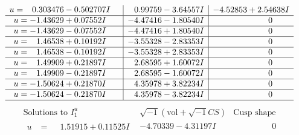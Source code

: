 \documentclass[1p]{elsarticle_modified}
\theoremstyle{definition}
\newcommand{\I}{\sqrt{-1}}
\begin{document}
$$\begin{array}{c|c|c}
\begin{aligned}
u &= \phantom{-}0.303476 - 0.502707 I\end{aligned}
 & \phantom{-}0.99759 - 3.64557 I & -4.52853 + 2.54638 I \\ \hline\begin{aligned}
u &= -1.43629 + 0.07552 I\end{aligned}
 & -4.47416 - 1.80540 I & \phantom{-0.000000 } 0 \\ \hline\begin{aligned}
u &= -1.43629 - 0.07552 I\end{aligned}
 & -4.47416 + 1.80540 I & \phantom{-0.000000 } 0 \\ \hline\begin{aligned}
u &= \phantom{-}1.46538 + 0.10192 I\end{aligned}
 & -3.55328 - 2.83353 I & \phantom{-0.000000 } 0 \\ \hline\begin{aligned}
u &= \phantom{-}1.46538 - 0.10192 I\end{aligned}
 & -3.55328 + 2.83353 I & \phantom{-0.000000 } 0 \\ \hline\begin{aligned}
u &= \phantom{-}1.49909 + 0.21897 I\end{aligned}
 & \phantom{-}2.68595 + 1.60072 I & \phantom{-0.000000 } 0 \\ \hline\begin{aligned}
u &= \phantom{-}1.49909 - 0.21897 I\end{aligned}
 & \phantom{-}2.68595 - 1.60072 I & \phantom{-0.000000 } 0 \\ \hline\begin{aligned}
u &= -1.50624 + 0.21870 I\end{aligned}
 & \phantom{-}4.35978 + 3.82234 I & \phantom{-0.000000 } 0 \\ \hline\begin{aligned}
u &= -1.50624 - 0.21870 I\end{aligned}
 & \phantom{-}4.35978 - 3.82234 I & \phantom{-0.000000 } 0\\
 \hline 
 \end{array}$$\newpage$$\begin{array}{c|c|c}  
\text{Solutions to }I^u_{1}& \I (\text{vol} + \sqrt{-1}CS) & \text{Cusp shape}\\
 \hline 
\begin{aligned}
u &= \phantom{-}1.51915 + 0.11525 I\end{aligned}
 & -4.70339 - 4.31197 I & \phantom{-0.000000 } 0 \\ \hline\begin{aligned}

\end{aligned}
\end{array}$$
\end{document}
